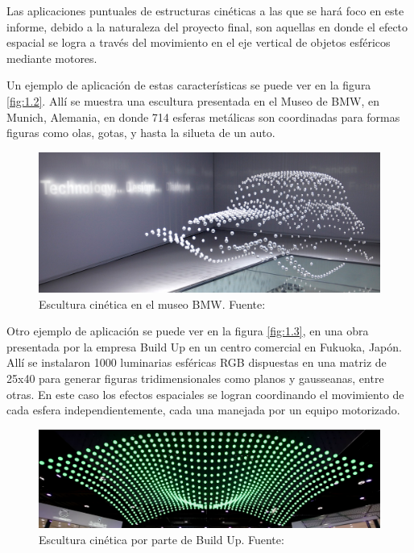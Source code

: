 Las aplicaciones puntuales de estructuras cinéticas a las que se hará foco en este informe, debido a la naturaleza del proyecto final, son aquellas en donde el efecto espacial se logra a través del movimiento en el eje vertical de objetos esféricos mediante motores. 

Un ejemplo de aplicación de estas características se puede ver en la figura \ref{fig:1.2}. Allí se muestra una escultura presentada en el Museo de BMW, en Munich, Alemania, en donde 714 esferas metálicas son coordinadas para formas figuras como olas, gotas, y hasta la silueta de un auto.

\begin{figure}[!ht]
	\centering
	\includegraphics[width=15cm,scale=1]{resources/1_2-kinSculp.png}
	\caption{ Escultura cinética en el museo BMW. Fuente: \cite{fig1_2} }
	\label{fig:\thefigure}
\end{figure}

Otro ejemplo de aplicación se puede ver en la figura \ref{fig:1.3}, en una obra presentada por la empresa Build Up en un centro comercial en Fukuoka, Japón. Allí se instalaron 1000 luminarias esféricas RGB dispuestas en una matriz de 25x40 para generar figuras tridimensionales como planos y gausseanas, entre otras. En este caso los efectos espaciales se logran coordinando el movimiento de cada esfera independientemente, cada una manejada por un equipo motorizado.
\begin{figure}[!ht]
	\centering
	\includegraphics[width=15cm,scale=1]{resources/1_3-kinSculp.png}
	\caption{ Escultura cinética por parte de Build Up. Fuente: \cite{fig1_3} }
	\label{fig:\thefigure}
\end{figure}

